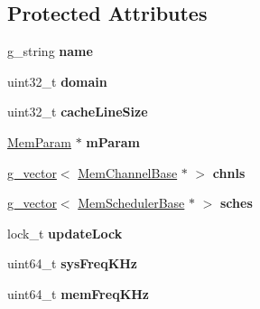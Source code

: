\subsection*{Protected Attributes}
\begin{DoxyCompactItemize}
\item 
\hypertarget{classMemControllerBase_a365a95eafef280acf977109508e3822a}{g\-\_\-string {\bfseries name}}\label{classMemControllerBase_a365a95eafef280acf977109508e3822a}

\item 
\hypertarget{classMemControllerBase_aa53b4d80588c5b80992893d5b0a77290}{uint32\-\_\-t {\bfseries domain}}\label{classMemControllerBase_aa53b4d80588c5b80992893d5b0a77290}

\item 
\hypertarget{classMemControllerBase_aac8a82822840a4e9429177aad75a5bc0}{uint32\-\_\-t {\bfseries cache\-Line\-Size}}\label{classMemControllerBase_aac8a82822840a4e9429177aad75a5bc0}

\item 
\hypertarget{classMemControllerBase_a723ddecb498404f3ada20a85549da45c}{\hyperlink{classMemParam}{Mem\-Param} $\ast$ {\bfseries m\-Param}}\label{classMemControllerBase_a723ddecb498404f3ada20a85549da45c}

\item 
\hypertarget{classMemControllerBase_a3192c564283ff25cf0a071b0f0070806}{\hyperlink{classg__vector}{g\-\_\-vector}$<$ \hyperlink{classMemChannelBase}{Mem\-Channel\-Base} $\ast$ $>$ {\bfseries chnls}}\label{classMemControllerBase_a3192c564283ff25cf0a071b0f0070806}

\item 
\hypertarget{classMemControllerBase_a734b5b07e0c2e8162a45c5a29e2f98f1}{\hyperlink{classg__vector}{g\-\_\-vector}$<$ \hyperlink{classMemSchedulerBase}{Mem\-Scheduler\-Base} $\ast$ $>$ {\bfseries sches}}\label{classMemControllerBase_a734b5b07e0c2e8162a45c5a29e2f98f1}

\item 
\hypertarget{classMemControllerBase_a4213279ff6df93d1c57931d4258a0914}{lock\-\_\-t {\bfseries update\-Lock}}\label{classMemControllerBase_a4213279ff6df93d1c57931d4258a0914}

\item 
\hypertarget{classMemControllerBase_a4e70d2029307bb11b52d92b3fafc3703}{uint64\-\_\-t {\bfseries sys\-Freq\-K\-Hz}}\label{classMemControllerBase_a4e70d2029307bb11b52d92b3fafc3703}

\item 
\hypertarget{classMemControllerBase_ab00504a6cd30b54b33d68052301b0eb5}{uint64\-\_\-t {\bfseries mem\-Freq\-K\-Hz}}\label{classMemControllerBase_ab00504a6cd30b54b33d68052301b0eb5}


\end{DoxyCompactItemize}
